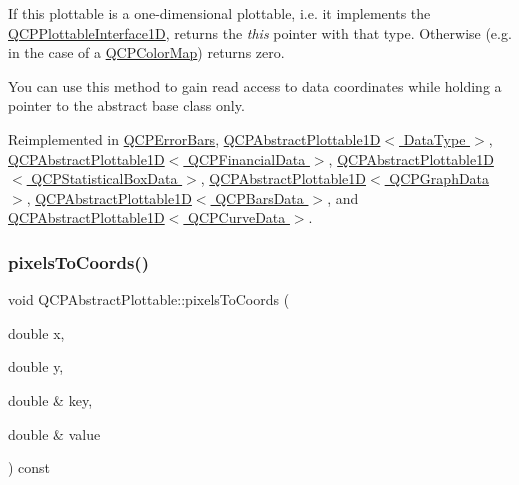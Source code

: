 If this plottable is a one-\/dimensional plottable, i.\+e. it implements the \hyperlink{classQCPPlottableInterface1D}{Q\+C\+P\+Plottable\+Interface1D}, returns the {\itshape this} pointer with that type. Otherwise (e.\+g. in the case of a \hyperlink{classQCPColorMap}{Q\+C\+P\+Color\+Map}) returns zero.

You can use this method to gain read access to data coordinates while holding a pointer to the abstract base class only. 

Reimplemented in \hyperlink{classQCPErrorBars_a0b6fbf3a943b4241ee485d066cc8562a}{Q\+C\+P\+Error\+Bars}, \hyperlink{classQCPAbstractPlottable1D_ac58fb47bfe330f6931ed8e64326387d7}{Q\+C\+P\+Abstract\+Plottable1\+D$<$ Data\+Type $>$}, \hyperlink{classQCPAbstractPlottable1D_ac58fb47bfe330f6931ed8e64326387d7}{Q\+C\+P\+Abstract\+Plottable1\+D$<$ Q\+C\+P\+Financial\+Data $>$}, \hyperlink{classQCPAbstractPlottable1D_ac58fb47bfe330f6931ed8e64326387d7}{Q\+C\+P\+Abstract\+Plottable1\+D$<$ Q\+C\+P\+Statistical\+Box\+Data $>$}, \hyperlink{classQCPAbstractPlottable1D_ac58fb47bfe330f6931ed8e64326387d7}{Q\+C\+P\+Abstract\+Plottable1\+D$<$ Q\+C\+P\+Graph\+Data $>$}, \hyperlink{classQCPAbstractPlottable1D_ac58fb47bfe330f6931ed8e64326387d7}{Q\+C\+P\+Abstract\+Plottable1\+D$<$ Q\+C\+P\+Bars\+Data $>$}, and \hyperlink{classQCPAbstractPlottable1D_ac58fb47bfe330f6931ed8e64326387d7}{Q\+C\+P\+Abstract\+Plottable1\+D$<$ Q\+C\+P\+Curve\+Data $>$}.

\mbox{\label{classQCPAbstractPlottable_a3903c1120ab5c27e7fa46b597ef267bd}} 
\subsubsection{\texorpdfstring{pixels\+To\+Coords()}{pixelsToCoords()}\hspace{0.1cm}{\footnotesize\ttfamily [1/2]}}
{\footnotesize\ttfamily void Q\+C\+P\+Abstract\+Plottable\+::pixels\+To\+Coords (\begin{DoxyParamCaption}\item[{double}]{x,  }\item[{double}]{y,  }\item[{double \&}]{key,  }\item[{double \&}]{value }\end{DoxyParamCaption}) const}

